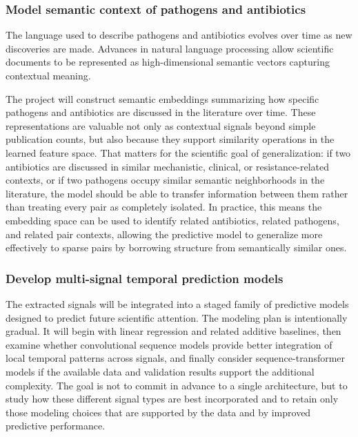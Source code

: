 \documentclass[
]{article}
\begin{document}
\subsubsection{Model semantic context of pathogens and
antibiotics}\label{objective-3-model-semantic-context-of-pathogens-and-antibiotics}

The language used to describe pathogens and antibiotics evolves over
time as new discoveries are made. Advances in natural language
processing allow scientific documents to be represented as
high-dimensional semantic vectors capturing contextual meaning.

The project will construct semantic embeddings summarizing how specific
pathogens and antibiotics are discussed in the literature over time.
These representations are valuable not only as contextual signals
beyond simple publication counts, but also because they support
similarity operations in the learned feature space. That matters for the
scientific goal of generalization: if two antibiotics are discussed in
similar mechanistic, clinical, or resistance-related contexts, or if two
pathogens occupy similar semantic neighborhoods in the literature, the
model should be able to transfer information between them rather than
treating every pair as completely isolated. In practice, this means the
embedding space can be used to identify related antibiotics, related
pathogens, and related pair contexts, allowing the predictive model to
generalize more effectively to sparse pairs by borrowing structure from
semantically similar ones.

\subsubsection{Develop multi-signal temporal prediction
models}\label{objective-4-develop-multi-signal-temporal-prediction-models}

The extracted signals will be integrated into a staged family of
predictive models designed to predict future scientific attention. The
modeling plan is intentionally gradual. It will begin with linear
regression and related additive baselines, then examine whether
convolutional sequence models provide better integration of local
temporal patterns across signals, and finally consider
sequence-transformer models if the available data and validation results
support the additional complexity. The goal is not to commit in advance
to a single architecture, but to study how these different signal types
are best incorporated and to retain only those modeling choices that
are supported by the data and by improved predictive performance.
\end{document}
